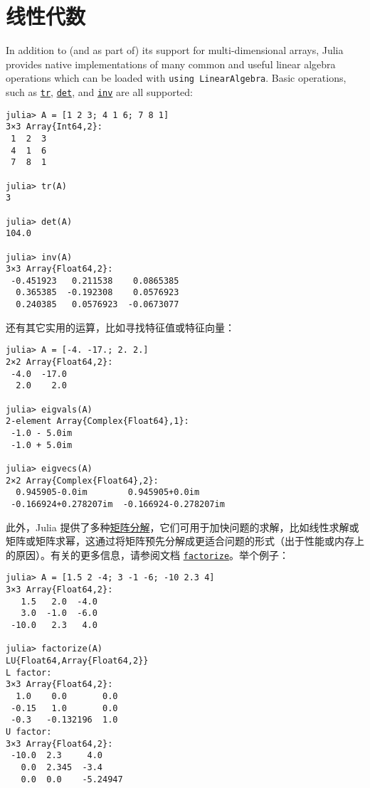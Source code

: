\hypertarget{12233296614674559904}{}


\chapter{线性代数}





In addition to (and as part of) its support for multi-dimensional arrays, Julia provides native implementations of many common and useful linear algebra operations which can be loaded with \texttt{using LinearAlgebra}. Basic operations, such as \hyperlink{3355659645971312171}{\texttt{tr}}, \hyperlink{16543378577000914469}{\texttt{det}}, and \hyperlink{13336866048543706848}{\texttt{inv}} are all supported:




\begin{verbatim}
julia> A = [1 2 3; 4 1 6; 7 8 1]
3×3 Array{Int64,2}:
 1  2  3
 4  1  6
 7  8  1

julia> tr(A)
3

julia> det(A)
104.0

julia> inv(A)
3×3 Array{Float64,2}:
 -0.451923   0.211538    0.0865385
  0.365385  -0.192308    0.0576923
  0.240385   0.0576923  -0.0673077
\end{verbatim}



还有其它实用的运算，比如寻找特征值或特征向量：




\begin{verbatim}
julia> A = [-4. -17.; 2. 2.]
2×2 Array{Float64,2}:
 -4.0  -17.0
  2.0    2.0

julia> eigvals(A)
2-element Array{Complex{Float64},1}:
 -1.0 - 5.0im
 -1.0 + 5.0im

julia> eigvecs(A)
2×2 Array{Complex{Float64},2}:
  0.945905-0.0im        0.945905+0.0im
 -0.166924+0.278207im  -0.166924-0.278207im
\end{verbatim}



此外，Julia 提供了多种\hyperlink{14017178414387426770}{矩阵分解}，它们可用于加快问题的求解，比如线性求解或矩阵或矩阵求幂，这通过将矩阵预先分解成更适合问题的形式（出于性能或内存上的原因）。有关的更多信息，请参阅文档 \hyperlink{7042962205548658937}{\texttt{factorize}}。举个例子：




\begin{verbatim}
julia> A = [1.5 2 -4; 3 -1 -6; -10 2.3 4]
3×3 Array{Float64,2}:
   1.5   2.0  -4.0
   3.0  -1.0  -6.0
 -10.0   2.3   4.0

julia> factorize(A)
LU{Float64,Array{Float64,2}}
L factor:
3×3 Array{Float64,2}:
  1.0    0.0       0.0
 -0.15   1.0       0.0
 -0.3   -0.132196  1.0
U factor:
3×3 Array{Float64,2}:
 -10.0  2.3     4.0
   0.0  2.345  -3.4
   0.0  0.0    -5.24947
\end{verbatim}



